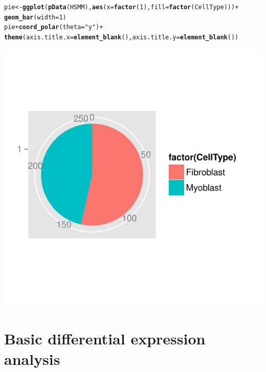 \documentclass[10pt,oneside]{article}\usepackage[]{graphicx}\usepackage[]{color}
\makeatletter
\def\maxwidth{ %
  \ifdim\Gin@nat@width>\linewidth
    \linewidth
  \else
    \Gin@nat@width
  \fi
}
\newcommand{\hlnum}[1]{\textcolor[rgb]{0.686,0.059,0.569}{#1}}%
\newcommand{\hlstr}[1]{\textcolor[rgb]{0.192,0.494,0.8}{#1}}%
\newcommand{\hlopt}[1]{\textcolor[rgb]{0,0,0}{#1}}%
\newcommand{\hlstd}[1]{\textcolor[rgb]{0.345,0.345,0.345}{#1}}%
\newcommand{\hlkwb}[1]{\textcolor[rgb]{0.69,0.353,0.396}{#1}}%
\newcommand{\hlkwc}[1]{\textcolor[rgb]{0.333,0.667,0.333}{#1}}%
\newcommand{\hlkwd}[1]{\textcolor[rgb]{0.737,0.353,0.396}{\textbf{#1}}}%
\newenvironment{kframe}{%
 \def\at@end@of@kframe{}%
 \ifinner\ifhmode%
  \def\at@end@of@kframe{\end{minipage}}%
  \begin{minipage}{\columnwidth}%
 \fi\fi%
 \def\FrameCommand##1{\hskip\@totalleftmargin \hskip-\fboxsep
 \colorbox{shadecolor}{##1}\hskip-\fboxsep
     \hskip-\linewidth \hskip-\@totalleftmargin \hskip\columnwidth}%
 \MakeFramed {\advance\hsize-\width
   \@totalleftmargin\z@ \linewidth\hsize
   \@setminipage}}%
 {\par\unskip\endMakeFramed%
 \at@end@of@kframe}
\newenvironment{knitrout}{}{} %
\makeatother
\begin{document}
\begin{knitrout}
\color{fgcolor}\begin{kframe}
\begin{alltt}
\hlstd{pie} \hlkwb{<-} \hlkwd{ggplot}\hlstd{(}\hlkwd{pData}\hlstd{(HSMM),} \hlkwd{aes}\hlstd{(}\hlkwc{x} \hlstd{=} \hlkwd{factor}\hlstd{(}\hlnum{1}\hlstd{),} \hlkwc{fill} \hlstd{=} \hlkwd{factor}\hlstd{(CellType)))} \hlopt{+}
 \hlkwd{geom_bar}\hlstd{(}\hlkwc{width} \hlstd{=} \hlnum{1}\hlstd{)}
\hlstd{pie} \hlopt{+} \hlkwd{coord_polar}\hlstd{(}\hlkwc{theta} \hlstd{=} \hlstr{"y"}\hlstd{)} \hlopt{+}
  \hlkwd{theme}\hlstd{(}\hlkwc{axis.title.x}\hlstd{=}\hlkwd{element_blank}\hlstd{(),} \hlkwc{axis.title.y}\hlstd{=}\hlkwd{element_blank}\hlstd{())}
\end{alltt}
\end{kframe}

{\centering \includegraphics[width=\maxwidth]{figure/cell_type_pie-1} 

}



\end{knitrout}

\section{Basic differential expression analysis}
\end{document}
